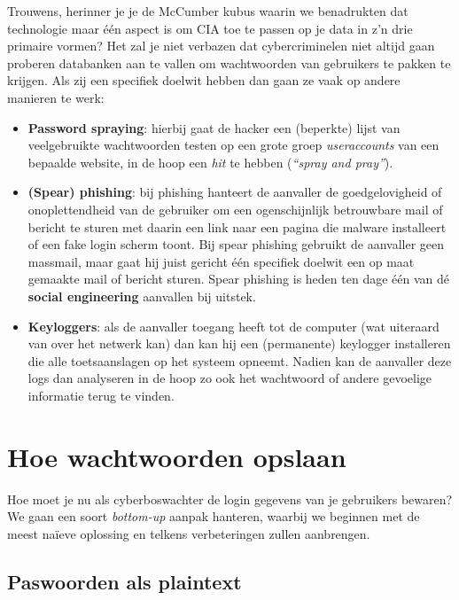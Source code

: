 \documentclass[
  10pt,
  dutch,
  paper=a4,
  ,captions=tableheading
]{scrbook}
\providecommand{\tightlist}{%
  \setlength{\itemsep}{0pt}\setlength{\parskip}{0pt}}
\begin{document}
Trouwens, herinner je je de McCumber kubus waarin we benadrukten dat
technologie maar één aspect is om CIA toe te passen op je data in z'n
drie primaire vormen? Het zal je niet verbazen dat cybercriminelen niet
altijd gaan proberen databanken aan te vallen om wachtwoorden van
gebruikers te pakken te krijgen. Als zij een specifiek doelwit hebben
dan gaan ze vaak op andere manieren te werk:

\begin{itemize}
\tightlist
\item
  \textbf{Password spraying}: hierbij gaat de hacker een (beperkte)
  lijst van veelgebruikte wachtwoorden testen op een grote groep
  \emph{useraccounts} van een bepaalde website, in de hoop een
  \emph{hit} te hebben (\emph{``spray and pray''}).
\item
  \textbf{(Spear) phishing}: bij phishing hanteert de aanvaller de
  goedgelovigheid of onoplettendheid van de gebruiker om een
  ogenschijnlijk betrouwbare mail of bericht te sturen met daarin een
  link naar een pagina die malware installeert of een fake login scherm
  toont. Bij spear phishing gebruikt de aanvaller geen massmail, maar
  gaat hij juist gericht één specifiek doelwit een op maat gemaakte mail
  of bericht sturen. Spear phishing is heden ten dage één van dé
  \textbf{social engineering} aanvallen bij uitstek.
\item
  \textbf{Keyloggers}: als de aanvaller toegang heeft tot de computer
  (wat uiteraard van over het netwerk kan) dan kan hij een (permanente)
  keylogger installeren die alle toetsaanslagen op het systeem opneemt.
  Nadien kan de aanvaller deze logs dan analyseren in de hoop zo ook het
  wachtwoord of andere gevoelige informatie terug te vinden.
\end{itemize}

\section{Hoe wachtwoorden opslaan}\label{hoe-wachtwoorden-opslaan}

Hoe moet je nu als cyberboswachter de login gegevens van je gebruikers
bewaren? We gaan een soort \emph{bottom-up} aanpak hanteren, waarbij we
beginnen met de meest naïeve oplossing en telkens verbeteringen zullen
aanbrengen.

\subsection{Paswoorden als plaintext}\label{paswoorden-als-plaintext}
\end{document}
